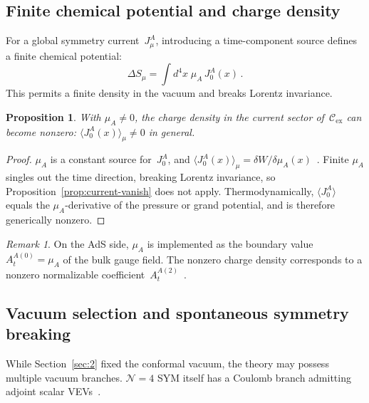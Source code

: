 \documentclass[
  aps,
  prd,
  preprint,
  groupedaddress,
  nofootinbib,
  longbibliography
]{revtex4-2}
\newtheorem{proposition}[definition]{Proposition}
\theoremstyle{remark}
\newtheorem{remark}[definition]{Remark}
\newcommand{\Cex}{\mathcal{C}_{\mathrm{ex}}}
\newcommand{\N}{\mathcal{N}}
\begin{document}
\subsection{Finite chemical potential and charge density}%
  \label{subsec:3-4}

For a global symmetry current~$J_\mu^A$, introducing a
time-component source defines a finite chemical potential:
\begin{equation}\label{eq:chem-pot}
  \Delta S_\mu = \int d^4x\;\mu_A\,J_0^A(x)\,.
\end{equation}
This permits a finite density in the vacuum and breaks Lorentz
invariance.

\begin{proposition}\label{prop:finite-mu}
With $\mu_A\neq 0$, the charge density in the current sector
of~$\Cex$ can become nonzero:
$\langle J_0^A(x)\rangle_\mu\neq 0$ in general.
\end{proposition}

\begin{proof}
$\mu_A$ is a constant source for~$J_0^A$, and
$\langle J_0^A(x)\rangle_\mu
= \delta W / \delta\mu_A(x)$~\cite{ref2,ref3,ref5,ref9,ref10}.
Finite $\mu_A$ singles out the time direction, breaking Lorentz
invariance, so Proposition~\ref{prop:current-vanish} does not
apply.
Thermodynamically, $\langle J_0^A\rangle$ equals the
$\mu_A$-derivative of the pressure or grand potential, and is
therefore generically nonzero.
\end{proof}

\begin{remark}\label{rem:AdS-RN}
On the AdS side, $\mu_A$ is implemented as the boundary value
$A_t^{A(0)}=\mu_A$ of the bulk gauge field.
The nonzero charge density corresponds to a nonzero normalizable
coefficient~$A_t^{A(2)}$~\cite{ref9,ref10,ref11}.
\end{remark}

\subsection{Vacuum selection and spontaneous symmetry breaking}%
  \label{subsec:3-5}

While Section~\ref{sec:2} fixed the conformal vacuum, the theory
may possess multiple vacuum branches.
$\N=4$ SYM itself has a Coulomb branch admitting adjoint scalar
VEVs~\cite{ref4,ref6,ref7}.
\end{document}
